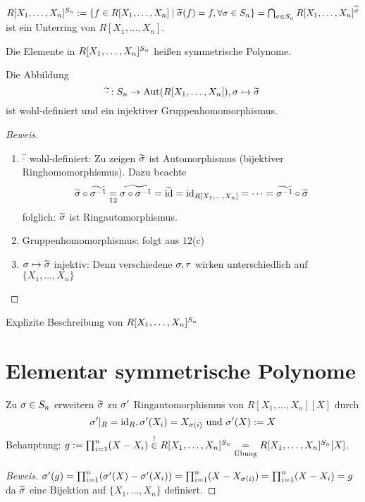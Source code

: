\documentclass[a4paper]{report}
\begin{document}
\begin{kor}
$R[X_{1}, \ldots, X_{n}]^{S_{n}} := \{f \in R[X_{1}, \ldots, X_{n}] \mid \tilde \s (f) = f, \forall \s \in \Sn\} = \bigcap_{\s \in \Sn}R[X_{1}, \ldots, X_{n}]^{\tilde \s}$ ist ein Unterring von $R[X_{1}, \ldots, X_{n}]$.
\end{kor}

\begin{defi}
Die Elemente in $R[X_{1}, \ldots, X_{n}]^{\Sn}$ heißen symmetrische Polynome.
\end{defi}

\begin{kor} Die Abbildung
  \[\tilde \cd : \Sn \to \Aut(R[X_{1}, \ldots, X_{n}]), \s \mps \tilde \s\]
  ist wohl-definiert und ein injektiver Gruppenhomomorphismus.

 \begin{proof}[Beweis]\item
\begin{enumerate}[1)]
  \item $\tilde \cd$ wohl-definiert: Zu zeigen $\tilde \s$ ist Automorphismus (bijektiver Ringhomomorphismus). Dazu beachte
        \[\tilde \s \circ \tilde {\s^{-1}} \underset{12} = \tilde{\s \circ \s^{-1}} = \tilde \id = \id_{R[X_{1}, \ldots, X_{n}]} = \cdots = \tilde {\s^{-1}} \circ \tilde \s\]
        folglich: $\tilde \s$ ist Ringautomorphismus.
  \item Gruppenhomomorphismus: folgt aus 12(c)
  \item $\s \mps \tilde \s$ injektiv: Denn verschiedene $\s, \tau$ wirken unterschiedlich auf $\{X_{1}, \ldots, X_{n}\}$
\end{enumerate}
 \end{proof}
\end{kor}

\begin{bem*}
Explizite Beschreibung von $R[X_{1}, \ldots, X_{n}]^{\Sn}$
\end{bem*}
\section{Elementar symmetrische Polynome}%
\begin{prop*}
Zu $\s \in \Sn$ erweitern $\tilde \s$ zu $\s'$ Ringautomorphismus von $R[X_{1}, \ldots, X_{n}][X]$ durch \[\s'|_{R} = \id_{R}, \s'(X_{i}) = X_{\s(i)} \text{ und } \s'(X) := X\]
Behauptung: $g:= \prod_{i = 1}^{n}(X - X_{i}) \overset ! \in R[X_{1}, \ldots, X_{n}]^{S_{n}} \ueb = R[X_{1}, \ldots, X_{n}]^{\Sn}[X]$.
\begin{proof}[Beweis]
  $\s'(g) = \prod_{i=1}^n (\s'(X) - \s'(X_{i})) = \prod_{i=1}^n (X - X_{\s(i)}) = \prod_{i=1}^n (X-X_{i}) = g$ da $\tilde \s$ eine Bijektion auf $\{X_{1}, ..., X_{n}\}$ definiert.
\end{proof}
\end{prop*}
\end{document}
